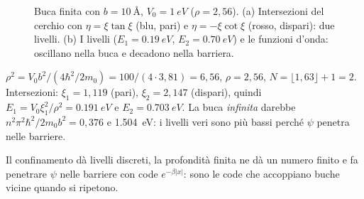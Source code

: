 \documentclass[11pt,a4paper]{article}
\begin{document}
\begin{figure}[tbp]
\centering
{}
\caption{Buca finita con $b=\SI{10}{\angstrom}$, $V_0=\SI{1}{eV}$ ($\rho=2{,}56$). (a) Intersezioni del cerchio con $\eta=\xi\tan\xi$ (blu, pari) e
$\eta=-\xi\cot\xi$ (rosso, dispari): due livelli. (b) I livelli ($E_1=\SI{0.19}{eV}$, $E_2=\SI{0.70}{eV}$) e le funzioni d'onda:
oscillano nella buca e decadono nella barriera.}\label{fig:buca}
\end{figure}

\begin{esempio}[$b=\SI{10}{\angstrom}$, $V_0=\SI{1}{eV}$, massa $m_0$]
$\rho^2=V_0b^2/(4\hbar^2/2m_0)=100/(4\cdot3{,}81)=6{,}56$, $\rho=2{,}56$, $N=\lfloor1{,}63\rfloor+1=2$. Intersezioni: $\xi_1=1{,}119$ (pari), $\xi_2=2{,}147$ (dispari),
quindi $E_1=V_0\xi_1^2/\rho^2=\SI{0.191}{eV}$ e $E_2=\SI{0.703}{eV}$. La buca \emph{infinita} darebbe $n^2\pi^2\hbar^2/2m_0b^2=0{,}376$ e
\SI{1.504}{eV}: i livelli veri sono più bassi perché $\psi$ penetra nelle barriere.
\end{esempio}

Il confinamento dà livelli discreti, la profondità finita ne dà un numero finito e fa penetrare $\psi$ nelle barriere con code $e^{-\beta|x|}$: sono le code che
accoppiano buche vicine quando si ripetono.
\end{document}
